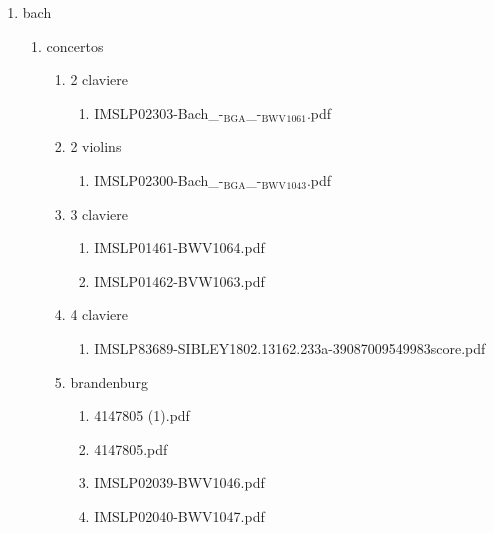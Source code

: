 \documentclass[11pt]{article}
\begin{document}
\begin{enumerate}
\item bach
\label{sec-1-1-1-1-44-6}
\begin{enumerate}
\item concertos
\label{sec-1-1-1-1-44-6-1}
\begin{enumerate}
\item 2 claviere
\label{sec-1-1-1-1-44-6-1-1}
\begin{enumerate}
\item IMSLP02303-Bach\_-$_{\text{BGA}}$\_-$_{\text{BWV}}$$_{\text{1061}}$.pdf
\label{sec-1-1-1-1-44-6-1-1-1}
\end{enumerate}

\item 2 violins
\label{sec-1-1-1-1-44-6-1-2}
\begin{enumerate}
\item IMSLP02300-Bach\_-$_{\text{BGA}}$\_-$_{\text{BWV}}$$_{\text{1043}}$.pdf
\label{sec-1-1-1-1-44-6-1-2-1}
\end{enumerate}

\item 3 claviere
\label{sec-1-1-1-1-44-6-1-3}
\begin{enumerate}
\item IMSLP01461-BWV1064.pdf
\label{sec-1-1-1-1-44-6-1-3-1}

\item IMSLP01462-BVW1063.pdf
\label{sec-1-1-1-1-44-6-1-3-2}
\end{enumerate}

\item 4 claviere
\label{sec-1-1-1-1-44-6-1-4}
\begin{enumerate}
\item IMSLP83689-SIBLEY1802.13162.233a-39087009549983score.pdf
\label{sec-1-1-1-1-44-6-1-4-1}
\end{enumerate}

\item brandenburg
\label{sec-1-1-1-1-44-6-1-5}
\begin{enumerate}
\item 4147805 (1).pdf
\label{sec-1-1-1-1-44-6-1-5-1}

\item 4147805.pdf
\label{sec-1-1-1-1-44-6-1-5-2}

\item IMSLP02039-BWV1046.pdf
\label{sec-1-1-1-1-44-6-1-5-3}

\item IMSLP02040-BWV1047.pdf
\label{sec-1-1-1-1-44-6-1-5-4}


\end{enumerate}
\end{enumerate}
\end{enumerate}
\end{enumerate}
\end{document}
